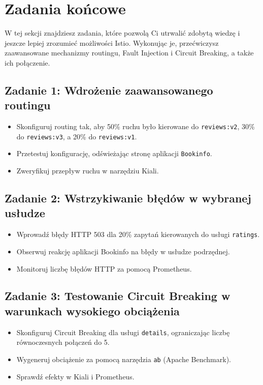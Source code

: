 \documentclass{article}
\begin{document}
\section{Zadania końcowe}

W tej sekcji znajdziesz zadania, które pozwolą Ci utrwalić zdobytą wiedzę i jeszcze lepiej zrozumieć możliwości Istio. Wykonując je, przećwiczysz zaawansowane mechanizmy routingu, Fault Injection i Circuit Breaking, a także ich połączenie.

\subsection{Zadanie 1: Wdrożenie zaawansowanego routingu}

\begin{itemize}
    \item Skonfiguruj routing tak, aby 50\% ruchu było kierowane do \texttt{reviews:v2}, 30\% do \texttt{reviews:v3}, a 20\% do \texttt{reviews:v1}.
    \item Przetestuj konfigurację, odświeżając stronę aplikacji \texttt{Bookinfo}.
    \item Zweryfikuj przepływ ruchu w narzędziu Kiali.
\end{itemize}

\subsection{Zadanie 2: Wstrzykiwanie błędów w wybranej usłudze}

\begin{itemize}
    \item Wprowadź błędy HTTP 503 dla 20\% zapytań kierowanych do usługi \texttt{ratings}.
    \item Obserwuj reakcję aplikacji Bookinfo na błędy w usłudze podrzędnej.
    \item Monitoruj liczbę błędów HTTP za pomocą Prometheus.
\end{itemize}

\subsection{Zadanie 3: Testowanie Circuit Breaking w warunkach wysokiego obciążenia}

\begin{itemize}
    \item Skonfiguruj Circuit Breaking dla usługi \texttt{details}, ograniczając liczbę równoczesnych połączeń do 5.
    \item Wygeneruj obciążenie za pomocą narzędzia \texttt{ab} (Apache Benchmark).
    \item Sprawdź efekty w Kiali i Prometheus.
\end{itemize}
\end{document}
